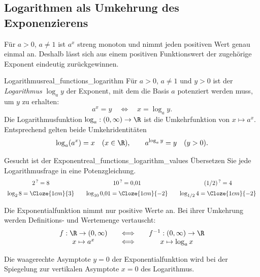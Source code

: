 \clearpage
\subsection{Logarithmen als Umkehrung des Exponenzierens}
\label{subsec:real_functions_logarithms}
Für $a>0$, $a\ne1$ ist $a^x$ streng monoton und nimmt jeden positiven
Wert genau einmal an. Deshalb lässt sich aus einem positiven
Funktionswert der zugehörige Exponent eindeutig zurückgewinnen.
\par\noindent\begin{minipage}{\linewidth}
\begin{DefinitionBox}{Logarithmus}{real_functions_logarithm}
  Für $a>0$, $a\ne1$ und $y>0$ ist der \emph{Logarithmus}
   $\log_a y$ der Exponent, mit dem die Basis $a$
  potenziert werden muss, um $y$ zu erhalten:
  \[
    a^x=y\quad\Longleftrightarrow\quad x=\log_a y.
  \]
  Die Logarithmusfunktion $\log_a:(0,\infty)\to\R$ ist die
  Umkehrfunktion von $x\mapsto a^x$.
  Entsprechend gelten beide Umkehridentitäten
  \[
    \log_a(a^x)=x\quad(x\in\R),\qquad
    a^{\log_a y}=y\quad(y>0).
  \]
\end{DefinitionBox}
\begin{ExampleBox}[before skip=0.3\baselineskip]{Gesucht ist der Exponent}{real_functions_logarithm_values}
  Übersetzen Sie jede Logarithmusfrage in eine Potenzgleichung.
  \[
    \begin{array}{c@{\qquad}c@{\qquad}c}
      2^{\,?}=8&10^{\,?}=0{,}01&(1/2)^{\,?}=4\\[0.5em]
      \log_2 8=\Cloze{1cm}{3}&
      \log_{10}0{,}01=\Cloze{1cm}{-2}&
      \log_{1/2}4=\Cloze{1cm}{-2}
    \end{array}
  \]
\end{ExampleBox}
\end{minipage}

\begin{center}
\end{center}

Die Exponentialfunktion nimmt nur positive Werte an. Bei ihrer
Umkehrung werden Definitions- und Wertemenge vertauscht:
\[
  \begin{array}{c@{\qquad\Longleftrightarrow\qquad}c}
    f:\R\to(0,\infty)&f^{-1}:(0,\infty)\to\R\\
    x\mapsto a^x&x\mapsto\log_a x
  \end{array}
\]
\begin{center}
\end{center}
Die waagerechte Asymptote $y=0$ der Exponentialfunktion wird bei der
Spiegelung zur \textcolor{green!55!black}{vertikalen Asymptote} $x=0$ des Logarithmus.

